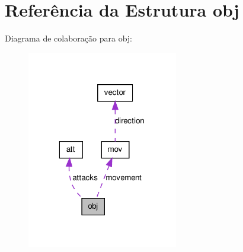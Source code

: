 \hypertarget{structobj}{
\section{Referência da Estrutura obj}
\label{structobj}
}


Diagrama de colaboração para obj:\nopagebreak
\begin{figure}[H]
\begin{center}
\leavevmode
\includegraphics[width=187pt]{structobj__coll__graph}
\end{center}
\end{figure}
